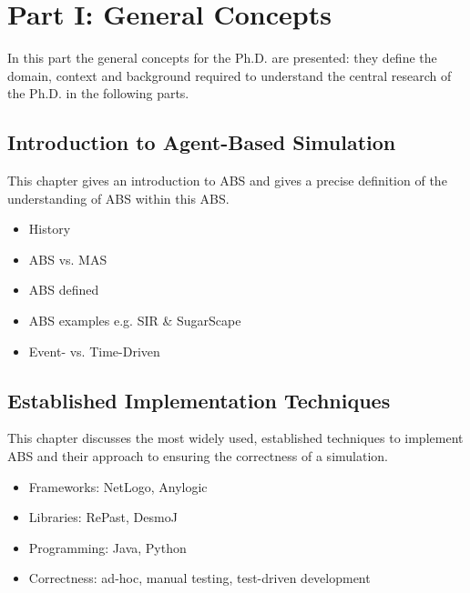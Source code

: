 \section{Part I: General Concepts}
In this part the general concepts for the Ph.D. are presented: they define the domain, context and background required to understand the central research of the Ph.D. in the following parts.

\subsection{Introduction to Agent-Based Simulation}
This chapter gives an introduction to ABS and gives a precise definition of the understanding of ABS within this ABS.
\begin{itemize}
	\item History
	\item ABS vs. MAS
	\item ABS defined
	\item ABS examples e.g. SIR \& SugarScape
	\item Event- vs. Time-Driven
\end{itemize}


\subsection{Established Implementation Techniques}
This chapter discusses the most widely used, established techniques to implement ABS and their approach to ensuring the correctness of a simulation.
\begin{itemize}
	\item Frameworks: NetLogo, Anylogic
	\item Libraries: RePast, DesmoJ
	\item Programming: Java, Python
	\item Correctness: ad-hoc, manual testing, test-driven development
\end{itemize}

